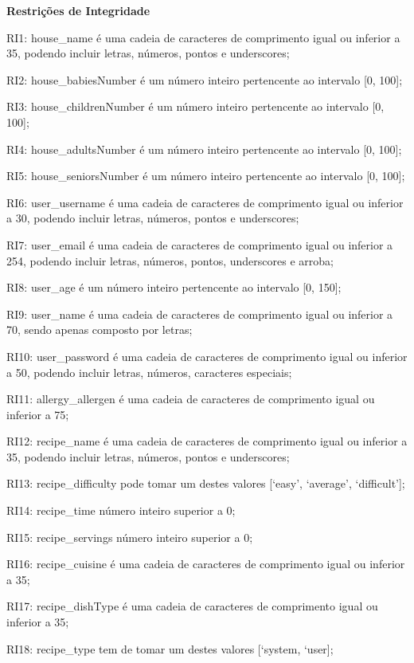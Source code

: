 \noindent\textbf{Restrições de Integridade}
\begin{description}
	\item RI1: house\_name é uma cadeia de caracteres de comprimento igual ou inferior a 35, podendo incluir letras, números, pontos e underscores;
	\item RI2: house\_babiesNumber é um número inteiro pertencente ao intervalo [0, 100];
	\item RI3: house\_childrenNumber é um número inteiro pertencente ao intervalo [0, 100];
	\item RI4: house\_adultsNumber é um número inteiro pertencente ao intervalo [0, 100];
	\item RI5: house\_seniorsNumber é um número inteiro pertencente ao intervalo [0, 100];
	\item RI6: user\_username é uma cadeia de caracteres de comprimento igual ou inferior a 30, podendo incluir letras, números, pontos e underscores;
	\item RI7: user\_email é uma cadeia de caracteres de comprimento igual ou inferior a 254, podendo incluir letras, números, pontos, underscores e arroba;
	\item RI8: user\_age é um número inteiro pertencente ao intervalo [0, 150];
	\item RI9: user\_name é uma cadeia de caracteres de comprimento igual ou inferior a 70, sendo apenas composto por letras;
	\item RI10: user\_password é uma cadeia de caracteres de comprimento igual ou inferior a 50, podendo incluir letras, números, caracteres especiais;
	\item RI11: allergy\_allergen é uma cadeia de caracteres de comprimento igual ou inferior a 75;
	\item RI12: recipe\_name é uma cadeia de caracteres de comprimento igual ou inferior a 35, podendo incluir letras, números, pontos e underscores;
	\item RI13: recipe\_difficulty pode tomar um destes valores [‘easy’, ‘average’, ‘difficult’];
	\item RI14: recipe\_time número inteiro superior a 0;
	\item RI15: recipe\_servings número inteiro superior a 0;
	\item RI16: recipe\_cuisine é uma cadeia de caracteres de comprimento igual ou inferior a 35;
	\item RI17: recipe\_dishType é uma cadeia de caracteres de comprimento igual ou inferior a 35;
	\item RI18: recipe\_type tem de tomar um destes valores [‘system, ‘user];

\end{description}
